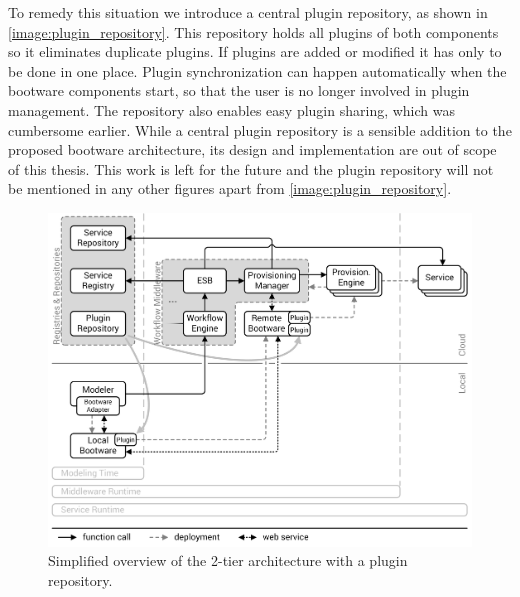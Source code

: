To remedy this situation we introduce a central plugin repository, as shown in \autoref{image:plugin_repository}.
This repository holds all plugins of both components so it eliminates duplicate plugins.
If plugins are added or modified it has only to be done in one place.
Plugin synchronization can happen automatically when the bootware components start, so that the user is no longer involved in plugin management.
The repository also enables easy plugin sharing, which was cumbersome earlier.
While a central plugin repository is a sensible addition to the proposed bootware architecture, its design and implementation are out of scope of this thesis.
This work is left for the future and the plugin repository will not be mentioned in any other figures apart from \autoref{image:plugin_repository}.

\begin{figure}[!htbp]
	\centering
	\includegraphics[resolution=600]{design/assets/plugin_repository}
	\caption{Simplified overview of the 2-tier architecture with a plugin repository.}
	\label{image:plugin_repository}
\end{figure}
